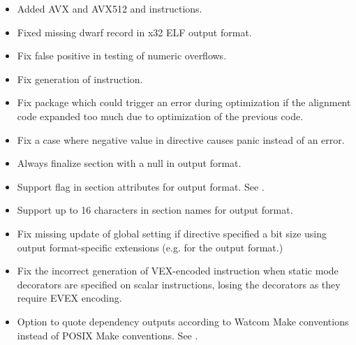 
\begin{itemize}
    \item{Added AVX and AVX512  and  instructions.}
    \item{Fixed missing dwarf record in x32 ELF output format.}
\end{itemize}


\begin{itemize}
    \item{Fix false positive in testing of numeric overflows.}

    \item{Fix generation of  instruction.}

    \item{Fix  package which could trigger an error during
        optimization if the alignment code expanded too much due to
        optimization of the previous code.}

    \item{Fix a case where negative value in  directive causes
        panic instead of an error.}

    \item{Always finalize  section with a null in
         output format.}

    \item{Support  flag in section attributes for 
        output format. See .}

    \item{Support up to 16 characters in section names for 
        output format.}

    \item{Fix missing update of global  setting if 
        directive specified a bit size using output format-specific
        extensions (e.g.  for the  output format.)}

    \item{Fix the incorrect generation of VEX-encoded instruction when static
        mode decorators are specified on scalar instructions, losing the
        decorators as they require EVEX encoding.}

    \item{Option  to quote dependency outputs according to Watcom
        Make conventions instead of POSIX Make conventions. See .}


\end{itemize}
